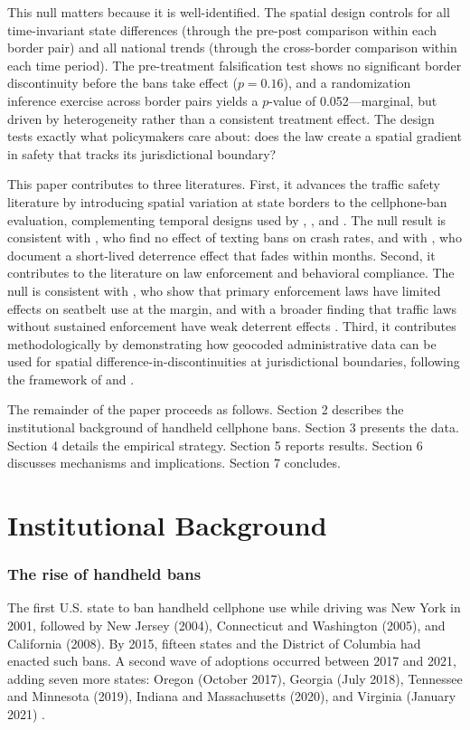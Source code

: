 \documentclass[12pt]{article}
\begin{document}
This null matters because it is well-identified. The spatial design controls for all time-invariant state differences (through the pre-post comparison within each border pair) and all national trends (through the cross-border comparison within each time period). The pre-treatment falsification test shows no significant border discontinuity before the bans take effect ($p = 0.16$), and a randomization inference exercise across border pairs yields a $p$-value of 0.052---marginal, but driven by heterogeneity rather than a consistent treatment effect. The design tests exactly what policymakers care about: does the law create a spatial gradient in safety that tracks its jurisdictional boundary?

This paper contributes to three literatures. First, it advances the traffic safety literature by introducing spatial variation at state borders to the cellphone-ban evaluation, complementing temporal designs used by \citet{Lim2017}, \citet{Rocco2023}, and \citet{WrightDorilas2022}. The null result is consistent with \citet{Bhargava2013}, who find no effect of texting bans on crash rates, and with \citet{Abouk2013}, who document a short-lived deterrence effect that fades within months. Second, it contributes to the literature on law enforcement and behavioral compliance. The null is consistent with \citet{Carpenter2017}, who show that primary enforcement laws have limited effects on seatbelt use at the margin, and with a broader finding that traffic laws without sustained enforcement have weak deterrent effects \citep{DeAngelo2017}. Third, it contributes methodologically by demonstrating how geocoded administrative data can be used for spatial difference-in-discontinuities at jurisdictional boundaries, following the framework of \citet{Keele2015} and \citet{Dell2010}.

The remainder of the paper proceeds as follows. Section 2 describes the institutional background of handheld cellphone bans. Section 3 presents the data. Section 4 details the empirical strategy. Section 5 reports results. Section 6 discusses mechanisms and implications. Section 7 concludes.


\section{Institutional Background}

\subsubsection*{The rise of handheld bans} The first U.S. state to ban handheld cellphone use while driving was New York in 2001, followed by New Jersey (2004), Connecticut and Washington (2005), and California (2008). By 2015, fifteen states and the District of Columbia had enacted such bans. A second wave of adoptions occurred between 2017 and 2021, adding seven more states: Oregon (October 2017), Georgia (July 2018), Tennessee and Minnesota (2019), Indiana and Massachusetts (2020), and Virginia (January 2021) \citep{GHSA2023, IIHS2024}.
\end{document}
